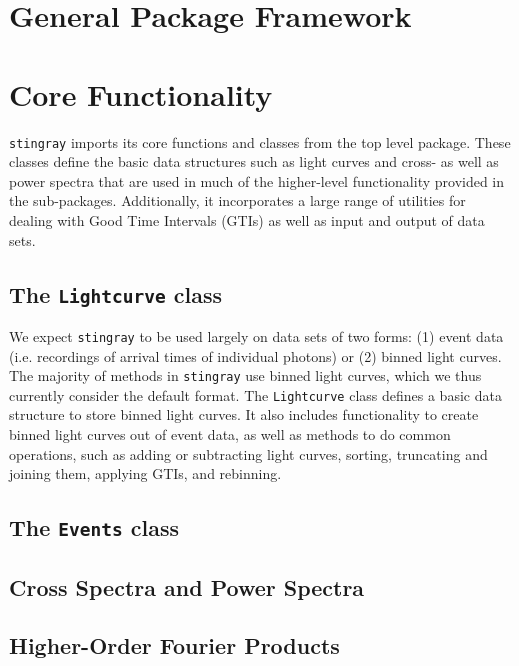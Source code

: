 \documentclass[12pt]{emulateapj}
\newcommand{\stingray}{\texttt{stingray}\xspace}
\newcommand{\lightcurve}{\texttt{Lightcurve}\xspace}
\begin{document}
\section{General Package Framework}
\label{sec:general_package}




\section{Core Functionality}
\label{sec:core}

\stingray imports its core functions and classes from the top level package. 
These classes define the basic data structures such as light curves and cross- as well as power spectra that are used in much of the higher-level functionality provided in the sub-packages. 
Additionally, it incorporates a large range of utilities for dealing with Good Time Intervals (GTIs) as well as input and output of data sets.


\subsection{The \texttt{Lightcurve} class}
\label{sec:lightcurve}

We expect \stingray to be used largely on data sets of two forms: (1) event data (i.e. recordings of arrival times of individual photons) or (2) binned light curves. 
The majority of methods in \stingray use binned light curves, which we thus currently consider the default format. The \lightcurve class defines a basic data structure to store binned light curves. 
It also includes functionality to create binned light curves out of event data, as well as methods to do common operations, such as adding or subtracting light curves, sorting, truncating and joining them, applying GTIs, and rebinning. 

\subsection{The \texttt{Events} class}

\subsection{Cross Spectra and Power Spectra}
\label{sec:csps}

\subsection{Higher-Order Fourier Products}
\label{sec:fourier_others}
\end{document}
